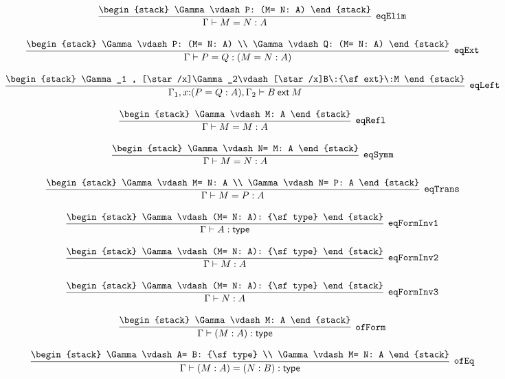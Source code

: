 \[
\infer[{\tt eqElim}]{\Gamma \vdash M= N: A}{
\begin{stack}
\Gamma \vdash P: (M= N: A)
\end{stack}}
\]

\[
\infer[{\tt eqExt}]{\Gamma \vdash P= Q: (M= N: A)}{
\begin{stack}
\Gamma \vdash P: (M= N: A)
\\
\Gamma \vdash Q: (M= N: A)
\end{stack}}
\]

\[
\infer[{\tt eqLeft}]{\Gamma_1 ,x\mathord{:}(P= Q: A), \Gamma_2 \vdash B\:{\sf ext}\:M}{
\begin{stack}
\Gamma_1 , [\star /x]\Gamma_2\vdash [\star /x]B\:{\sf ext}\:M
\end{stack}}
\]

\[
\infer[{\tt eqRefl}]{\Gamma \vdash M= M: A}{
\begin{stack}
\Gamma \vdash M: A
\end{stack}}
\]

\[
\infer[{\tt eqSymm}]{\Gamma \vdash M= N: A}{
\begin{stack}
\Gamma \vdash N= M: A
\end{stack}}
\]

\[
\infer[{\tt eqTrans}]{\Gamma \vdash M= P: A}{
\begin{stack}
\Gamma \vdash M= N: A
\\
\Gamma \vdash N= P: A
\end{stack}}
\]

\[
\infer[{\tt eqFormInv1}]{\Gamma \vdash A: {\sf type}}{
\begin{stack}
\Gamma \vdash (M= N: A): {\sf type}
\end{stack}}
\]

\[
\infer[{\tt eqFormInv2}]{\Gamma \vdash M: A}{
\begin{stack}
\Gamma \vdash (M= N: A): {\sf type}
\end{stack}}
\]

\[
\infer[{\tt eqFormInv3}]{\Gamma \vdash N: A}{
\begin{stack}
\Gamma \vdash (M= N: A): {\sf type}
\end{stack}}
\]

\[
\infer[{\tt ofForm}]{\Gamma \vdash (M: A): {\sf type}}{
\begin{stack}
\Gamma \vdash M: A
\end{stack}}
\]

\[
\infer[{\tt ofEq}]{\Gamma \vdash (M: A)= (N: B): {\sf type}}{
\begin{stack}
\Gamma \vdash A= B: {\sf type}
\\
\Gamma \vdash M= N: A
\end{stack}}
\]

